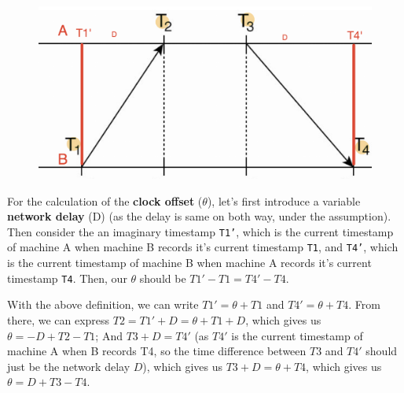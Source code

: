 \documentclass[11pt]{article}
\begin{document}
\begin{figure}[h]
	\center
	\includegraphics[width=\linewidth/4]{Q1.png}
\end{figure}

	
	
	
For the calculation of the \textbf{clock offset} ($\theta$), let's first introduce a variable \textbf{network delay} (D) (as the delay is same on both way, under the assumption). Then consider the an imaginary timestamp \texttt{T1'}, which is the current timestamp of machine A when machine B records it's current timestamp \texttt{T1}, and \texttt{T4'}, which is the current timestamp of machine B when machine A records it's current timestamp \texttt{T4}. Then, our $\theta$ should be $T1' - T1 = T4' - T4$.

With the above definition, we can write $T1' = \theta + T1$ and $T4' = \theta + T4$. From there, we can express $T2 = T1' + D = \theta + T1 + D$, which gives us $\theta = -D + T2 - T1$; And $T3 + D = T4'$ (as $T4'$ is the current timestamp of machine A when B records T4, so the time difference between $T3$ and $T4'$ should just be the network delay $D$), which gives us $T3 + D = \theta + T4$, which gives us $\theta = D + T3 - T4$.
\end{document}

